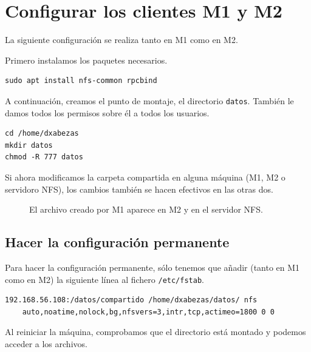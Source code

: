 \documentclass{article}
\begin{document}
\section{Configurar los clientes M1 y M2}

La siguiente configuración se realiza tanto en M1 como en M2.

Primero instalamos los paquetes necesarios.
\begin{Verbatim}
sudo apt install nfs-common rpcbind
\end{Verbatim}

A continuación, creamos el punto de montaje, el directorio \texttt{datos}. También le damos todos los permisos sobre él a todos los usuarios.
\begin{Verbatim}
cd /home/dxabezas
mkdir datos
chmod -R 777 datos
\end{Verbatim}

Si ahora modificamos la carpeta compartida en alguna máquina (M1, M2 o servidoro NFS), los cambios también se hacen efectivos en las otras dos.
\begin{figure}[H]
	\centering
	\caption{El archivo creado por M1 aparece en M2 y en el servidor NFS.}
	\label{fig:test}
\end{figure}

\subsection{Hacer la configuración permanente}

Para hacer la configuración permanente, sólo tenemos que añadir (tanto en M1 como en M2) la siguiente línea al fichero \texttt{/etc/fstab}.
\begin{Verbatim}[tabsize=4]
192.168.56.108:/datos/compartido /home/dxabezas/datos/ nfs
	auto,noatime,nolock,bg,nfsvers=3,intr,tcp,actimeo=1800 0 0
\end{Verbatim}
Al reiniciar la máquina, comprobamos que el directorio está montado y podemos acceder a los archivos.
\end{document}
